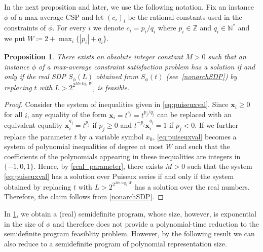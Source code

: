 \documentclass[11pt]{article}
\newtheorem{proposition}[theorem]{Proposition}
\theoremstyle{definition}
\theoremstyle{remark}
\newcommand{\Z}{\mathbb{Z}}
\newcommand{\N}{\mathbb{N}}
\begin{document}
In the next proposition and later, 
we use the following notation. Fix an instance $\phi$ of a max-average CSP and let $(c_i)_i$ be the rational constants used in the constraints of $\phi$. For every $i$ we denote $c_i = p_i/q_i$ where $p_i \in \Z$ and $q_i \in \N^*$ and we put $W \coloneqq 2 + \max_i\{|p_i| + q_i\}$.
\begin{proposition}\label{prop:toSDP}
There exists an absolute integer constant $M > 0$ such that 
an instance $\phi$ of a max-average constraint satisfaction problem 
has a solution if and only if 
the real SDP $S_\phi(L)$ obtained from $S_\phi(t)$ (see~\cref{nonarchSDP}) by replacing $t$ with $L > 2^{2^{Mn\log_2 W}}$, is feasible.
\end{proposition}
\begin{proof}
Consider the system of inequalities given in \cref{eq:puiseuxval}. Since $\bm{x}_i \ge 0$ for all $i$, any equality of the form $\bm{x}_i = t^{c_j} = t^{p_j/q_j}$ can be replaced with an equivalent equality $\bm{x}_i^{q_j} = t^{p_j}$ if $p_j \ge 0$ and $t^{-p_j}\bm{x}_i^{q_j} = 1$ if $p_j < 0$. If we further replace the parameter $t$ by a variable symbol $x_0$, \cref{eq:puiseuxval} becomes a system of polynomial inequalities of degree at most $W$ and such that the coefficients of the polynomials appearing in these inequalities are integers in $\{-1,0,1\}$. Hence, by \cref{real_parameter}, there exists $M > 0$ such that the system \cref{eq:puiseuxval} has a solution over Puiseux series if and only if the system obtained by replacing $t$ with $L > 2^{2^{Mn\log_2 W}}$ has a solution over the real numbers. Therefore, the claim follows from \cref{nonarchSDP}.
\end{proof}

In \cref{prop:toSDP}, we obtain a (real) semidefinite program, whose size, however, is exponential in the size of $\phi$ and therefore does not provide a polynomial-time reduction to the semidefinite program feasiblity problem. However, by the following result we can also reduce to
a semidefinite program of polynomial representation size. 
\end{document}
